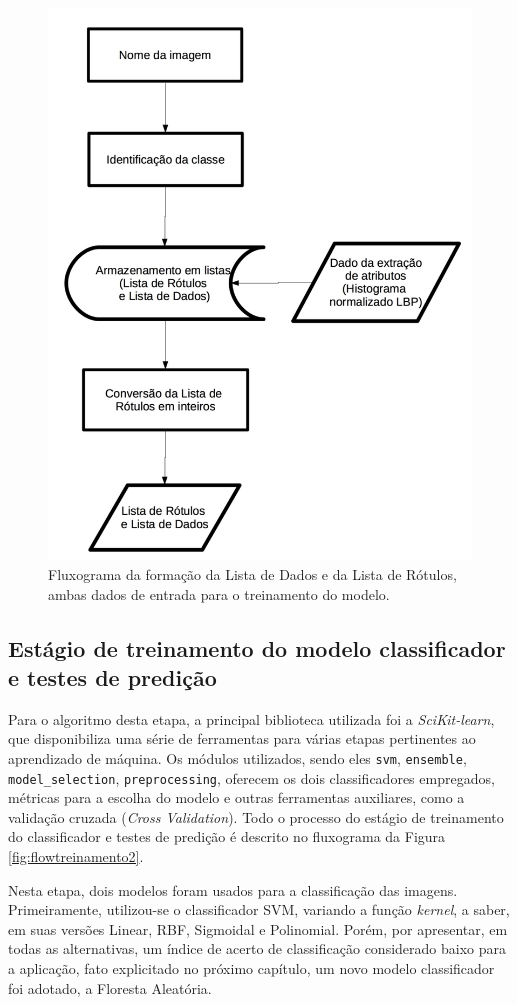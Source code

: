 \begin{figure}[H]
  \centering
  \includegraphics[width=0.55\linewidth]{figuras/treinamento1.pdf}
  \caption{Fluxograma da formação da Lista de Dados e da Lista de Rótulos, ambas dados de entrada para o treinamento do modelo.}
  \label{fig:flowtreinamento1}
\end{figure}



\subsection{Estágio de treinamento do modelo classificador e testes de predição}

Para o algoritmo desta etapa, a principal biblioteca utilizada foi a \textit{SciKit-learn}, que disponibiliza uma série de ferramentas para várias etapas pertinentes ao aprendizado de máquina. Os módulos utilizados, sendo eles \texttt{svm}, \texttt{ensemble}, \texttt{model\_selection}, \texttt{preprocessing}, oferecem os dois classificadores empregados, métricas para a escolha do modelo e outras ferramentas auxiliares, como a validação cruzada (\textit{Cross Validation}). Todo o processo do estágio de treinamento do classificador e testes de predição é descrito no fluxograma da Figura \ref{fig:flowtreinamento2}.



Nesta etapa, dois modelos foram usados para a classificação das imagens. Primeiramente, utilizou-se o classificador SVM, variando a função \textit{kernel}, a saber, em suas versões Linear, RBF, Sigmoidal e Polinomial. Porém, por apresentar, em todas as alternativas, um índice de acerto de classificação considerado baixo para a aplicação, fato explicitado no próximo capítulo, um novo modelo classificador foi adotado, a Floresta Aleatória.

